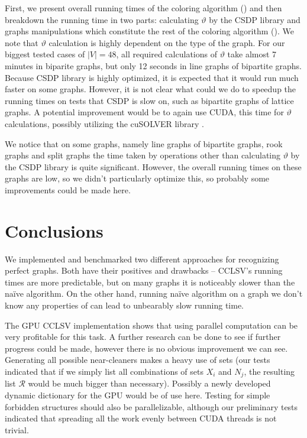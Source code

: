 First, we present overall running times of the coloring algorithm () and then breakdown the running time in two parts: calculating $\vartheta$ by the CSDP library and graphs manipulations which constitute the rest of the coloring algorithm (). We note that $\vartheta$ calculation is highly dependent on the type of the graph. For our biggest tested cases of $|V| = 48$, all required calculations of $\vartheta$ take almost 7 minutes in biparite graphs, but only 12 seconds in line graphs of bipartite graphs. Because CSDP library is highly optimized, it is expected that it would run much faster on some graphs. However, it is not clear what could we do to speedup the running times on tests that CSDP is slow on, such as bipartite graphs of lattice graphs. A potential improvement would be to again use CUDA, this time for $\vartheta$ calculations, possibly utilizing the cuSOLVER library \cite{cusolver}.


We notice that on some graphs, namely line graphs of bipartite graphs, rook graphs and split graphs the time taken by operations other than calculating $\vartheta$ by the CSDP library is quite significant. However, the overall running times on these graphs are low, so we didn't particularly optimize this, so probably some improvements could be made here.

\section{Conclusions}
We implemented and benchmarked two different approaches for recognizing perfect graphs. Both have their positives and drawbacks -- CCLSV's running times are more predictable, but on many graphs it is noticeably slower than the na\"ive algorithm. On the other hand, running na\"ive algorithm on a graph we don't know any properties of can lead to unbearably slow running time.

The GPU CCLSV implementation shows that using parallel computation can be very profitable for this task. A further research can be done to see if further progress could be made, however there is no obvious improvement we can see. Generating all possible near-cleaners makes a heavy use of sets (our tests indicated that if we simply list all combinations of sets $X_i$ and $N_j$, the resulting list $\mathcal{R}$ would be much bigger than necessary). Possibly a newly developed dynamic dictionary for the GPU \cite{Ashkiani2018} would be of use here. Testing for simple forbidden structures should also be parallelizable, although our preliminary tests indicated that spreading all the work evenly between CUDA threads is not trivial.

